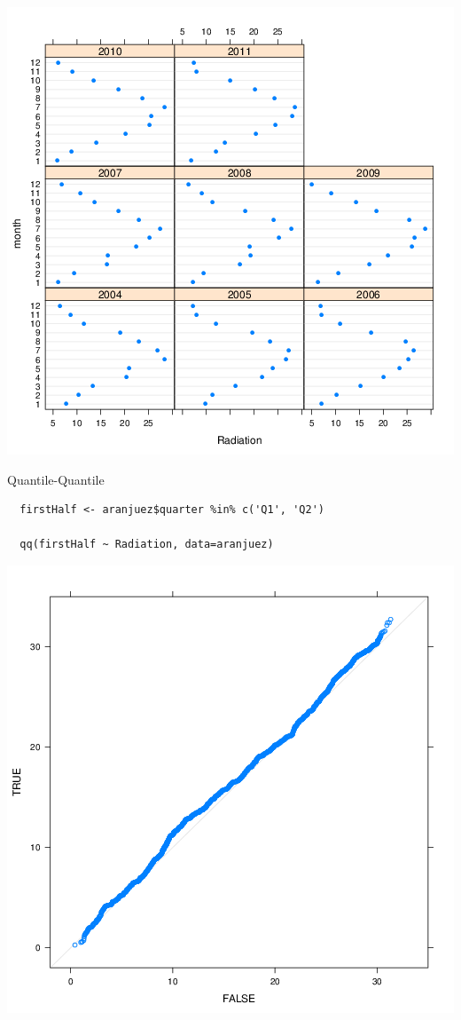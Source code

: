 \documentclass[xcolor={usenames,svgnames,dvipsnames}]{beamer}
\begin{document}
\begin{frame}[label={sec:orgheadline56}]{}
\includegraphics[width=.9\linewidth]{figs/dotplot.png}
\end{frame}


\begin{frame}[fragile,label={sec:orgheadline57}]{Quantile-Quantile}
 \lstset{language=R,label= ,caption= ,captionpos=b,numbers=none}
\begin{lstlisting}
  firstHalf <- aranjuez$quarter %in% c('Q1', 'Q2')
  
  qq(firstHalf ~ Radiation, data=aranjuez)
\end{lstlisting}
\end{frame}

\begin{frame}[label={sec:orgheadline58}]{}
\includegraphics[width=.9\linewidth]{figs/qqHalf.png}
\end{frame}
\end{document}
